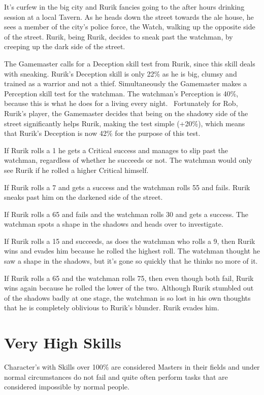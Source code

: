 \begin{rpg-examplebox}
It’s curfew in the big city and Rurik fancies going to the after hours drinking session at a local Tavern. As he heads down the street towards the ale house, he sees a member of the city’s police force, the Watch, walking up the opposite side of the street. Rurik, being Rurik, decides to sneak past the watchman, by creeping up the dark side of the street.

The Gamemaster calls for a Deception skill test from Rurik, since this skill deals with sneaking. Rurik’s Deception skill is only 22\% as he is big, clumsy and trained as a warrior and not a thief. Simultaneously the Gamemaster makes a Perception skill test for the watchman. The watchman’s Perception is 40\%, because this is what he does for a living every night.  Fortunately for Rob, Rurik’s player, the Gamemaster decides that being on the shadowy side of the street significantly helps Rurik, making the test simple (+20\%), which means that Rurik’s Deception is now 42\% for the purpose of this test.

If Rurik rolls a 1 he gets a Critical success and manages to slip past the watchman, regardless of whether he succeeds or not. The watchman would only see Rurik if he rolled a higher Critical himself.

If Rurik rolls a 7 and gets a success and the watchman rolls 55 and fails. Rurik sneaks past him on the darkened side of the street.

If Rurik rolls a 65 and fails and the watchman rolls 30 and gets a success. The watchman spots a shape in the shadows and heads over to investigate.

If Rurik rolls a 15 and succeeds, as does the watchman who rolls a 9, then Rurik wins and evades him because he rolled the highest roll. The watchman thought he saw a shape in the shadows, but it’s gone so quickly that he thinks no more of it.

If Rurik rolls a 65 and the watchman rolls 75, then even though both fail, Rurik wins again because he rolled the lower of the two. Although Rurik stumbled out of the shadows badly at one stage, the watchman is so lost in his own thoughts that he is completely oblivious to Rurik’s blunder. Rurik evades him.
\end{rpg-examplebox}


\section{Very High Skills}
Character’s with Skills over 100\% are considered Masters in their fields and under normal circumstances do not fail and quite often perform tasks that are considered impossible by normal people.

